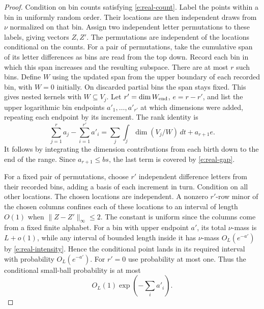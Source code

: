 \documentclass[11pt]{article}
\numberwithin{equation}{section}
\begin{document}
\begin{proof}
Condition on bin counts satisfying \eqref{e:real-count}. Label the
points within a bin in uniformly random order. Their locations are
then independent draws from $\nu$ normalized on that bin. Assign two
independent letter permutations to these labels, giving vectors $Z,Z'$.
The permutations are independent of the locations conditional on the
counts. For a pair of permutations, take the cumulative span of its
letter differences as bins are read from the top down. Record each
bin in which this span increases and the resulting subspace. There
are at most $r$ such bins. Define $W$ using the updated span from the
upper boundary of each recorded bin, with $W=0$ initially. On discarded
partial bins the span stays fixed. This gives nested kernels with
$W\subseteq V_j$. Let $r'=\dim W_{\rm end}$, $e=r-r'$, and list
the upper logarithmic bin endpoints $a'_1,\ldots,a'_{r'}$ at which
dimensions were added, repeating each endpoint by its increment.
The rank identity is
\begin{equation}
 \sum_{j=1}^r a_j-\sum_{i=1}^{r'}a'_i
       =\sum_j\int_j\dim(V_j/W)\,dt+a_{r+1} e.                \label{e:real-rank}
\end{equation}
It follows by integrating the dimension contributions from each birth
down to the end of the range. Since $a_{r+1}\le bs$, the last term
is covered by \eqref{e:real-gap}.

For a fixed pair of permutations, choose $r'$ independent difference
letters from their recorded bins, adding a basis of each increment
in turn. Condition on all other locations. The chosen locations are
independent. A nonzero $r'$-row minor of the chosen columns confines
each of these locations to an interval of length $O(1)$ when
$\|Z-Z'\|_\infty\le2$. The constant is uniform since the columns come
from a fixed finite alphabet. For a bin with upper endpoint $a'$, its
total $\nu$-mass is $L+o(1)$, while any interval of bounded length
inside it has $\nu$-mass $O_L(e^{-a'})$ by \eqref{e:real-intensity}.
Hence the conditional point lands in its required interval with
probability $O_L(e^{-a'})$. For
$r'=0$ use probability at most one. Thus the conditional small-ball
probability is at most
\begin{equation}
            O_L(1)\exp\left(-\sum_i a'_i\right).
                                                               \label{e:real-pivots}
\end{equation}


\end{proof}
\end{document}
